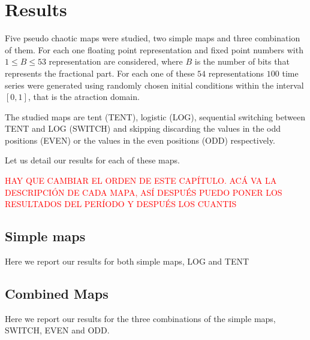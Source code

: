 \section{Results}\label{sec:resultados}

Five pseudo chaotic maps were studied, two simple maps and three combination of them.
For each one floating point representation and fixed point numbers with $1\leq B \leq 53$ representation are considered, where $B$ is the number of bits that represents the fractional part.
For each one of these $54$ representations $100$ time series were generated using randomly chosen initial conditions within the interval $[0,1]$, that is the atraction domain.

The studied maps are tent (TENT), logistic (LOG), sequential switching between TENT and LOG (SWITCH) and skipping discarding the values in the odd positions (EVEN) or the values in the even positions (ODD) respectively.

Let us detail our results for each of these maps.

\textcolor{red}{HAY QUE CAMBIAR EL ORDEN DE ESTE CAPÍTULO. ACÁ VA LA DESCRIPCIÓN DE CADA MAPA, ASÍ DESPUÉS PUEDO PONER LOS RESULTADOS DEL PERÍODO Y DESPUÉS LOS CUANTIS}

\subsection {Simple maps}\label{subsec:SimpleMaps}
Here we report our results for both simple maps, LOG and TENT



 

\subsection{Combined Maps}\label{subsec:SecSwitch}
Here we report our results for the three combinations of the simple maps, SWITCH, EVEN and ODD.





